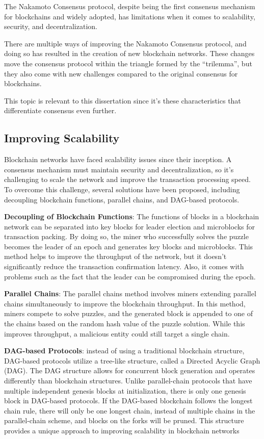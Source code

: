 The Nakamoto Consensus protocol, despite being the first consensus mechanism for block\-chains and widely adopted, has limitations when it comes to scalability, security, and decentralization.

There are multiple ways of improving the Nakamoto Consensus protocol, and doing so has resulted in the creation of new blockchain networks. These changes move the consensus protocol within the triangle formed by the ``trilemma'', but they also come with new challenges compared to the original consensus for blockchains.

This topic is relevant to this dissertation since it's these characteristics that differentiate consensus even further.

\subsection*{Improving Scalability}
Blockchain networks have faced scalability issues since their inception. A consensus mechanism must maintain security and decentralization, so it's challenging to scale the network and improve the transaction processing speed. To overcome this challenge, several solutions have been proposed, including decoupling blockchain functions, parallel chains, and DAG-based protocols.

\textbf{Decoupling of Blockchain Functions}: The functions of blocks in a blockchain network can be separated into key blocks for leader election and microblocks for transaction packing. By doing so, the miner who successfully solves the puzzle becomes the leader of an epoch and generates key blocks and microblocks. This method helps to improve the throughput of the network, but it doesn't significantly reduce the transaction confirmation latency. Also, it comes with problems such as the fact that the leader can be compromised during the epoch.

\textbf{Parallel Chains}: The parallel chains method involves miners extending parallel chains simultaneously to improve the blockchain throughput. In this method, miners compete to solve puzzles, and the generated block is appended to one of the chains based on the random hash value of the puzzle solution. While this improves throughput, a malicious entity could still target a single chain.

\textbf{DAG-based Protocols}: instead of using a traditional blockchain structure, DAG-based protocols utilize a tree-like structure, called a Directed Acyclic Graph (DAG). The DAG structure allows for concurrent block generation and operates differently than blockchain structures. Unlike parallel-chain protocols that have multiple independent genesis blocks at initialization, there is only one genesis block in DAG-based protocols. If the DAG-based block\-chain follows the longest chain rule, there will only be one longest chain, instead of multiple chains in the parallel-chain scheme, and blocks on the forks will be pruned. This structure provides a unique approach to improving scalability in blockchain networks 

